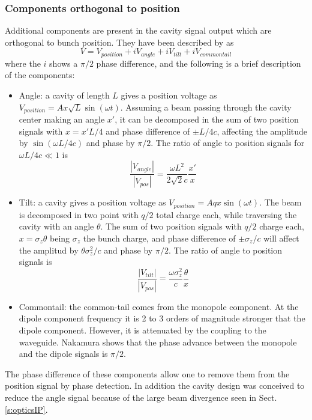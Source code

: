 \subsubsection{Components orthogonal to position}
Additional components are present in the cavity signal output which are orthogonal to bunch position. They have been described by \cite{Nakathese} as
\begin{equation}
 V=V_{position}+iV_{angle}+iV_{tilt}+iV_{commontail}
\end{equation}
where the $i$ shows a $\pi/2$ phase difference, and the following is a brief description of the components:\par
\begin{itemize}
 \item Angle: a cavity of length $L$ gives a position voltage as $V_{position}=Ax\sqrt{L}\sin(\omega t)$. Assuming a beam passing through the cavity center making an angle $x'$, it can be decomposed in the sum of two position signals with $x=x'L/4$ and phase difference of $\pm L/4c$, affecting the amplitude by $\sin(\omega L/4c)$ and phase by $\pi/2$. The ratio of angle to position signals for $\omega L/4c\ll 1$ is
 \begin{equation}
  \frac{|V_{angle}|}{|V_{pos}|}=\frac{\omega L^2}{2\sqrt{2}c}\frac{x'}{x}
 \end{equation}
\item Tilt: a cavity gives a position voltage as $V_{position}=Aqx\sin(\omega t)$. The beam is decomposed in two point with $q/2$ total charge each, while traversing the cavity with an angle $\theta$. The sum of two position signals with $q/2$ charge each,  $x=\sigma_z\theta$ being $\sigma_z$ the bunch charge, and phase difference of $\pm\sigma_z/c$ will affect the amplitud by $\theta\sigma_z^2/c$ and phase by $\pi/2$. The ratio of angle to position signals is
\begin{equation}
  \frac{|V_{tilt}|}{|V_{pos}|}=\frac{\omega \sigma_z^2}{c}\frac{\theta}{x}
\end{equation}
\item Commontail: the common-tail \cite{Shintake:1998fga} comes from the monopole component. At the dipole component frequency it is 2 to 3 orders of magnitude stronger that the dipole component. However, it is attenuated by the coupling to the waveguide. Nakamura \cite{Nakathese} shows that the phase advance between the monopole and the dipole signals is $\pi/2$.\par
\end{itemize}
The phase difference of these components allow one to remove them from the position signal by phase detection. In addition the cavity design was conceived to reduce the angle signal because of the large beam divergence seen in Sect. \ref{s:opticsIP}.\par
